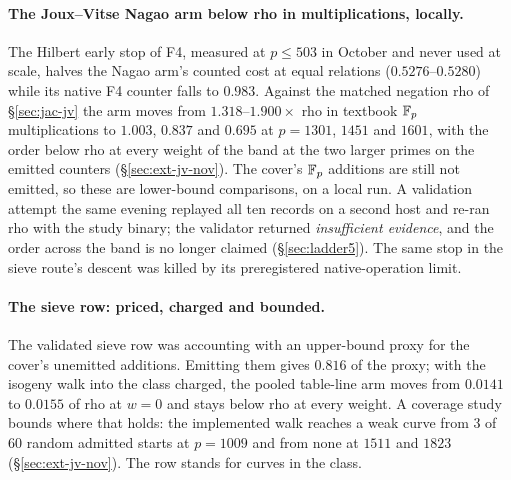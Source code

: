 \paragraph{The Joux--Vitse Nagao arm below rho in multiplications, locally.} The
Hilbert early stop of F4, measured at $p\le503$ in October and never used
at scale, halves the Nagao arm's counted cost at equal relations
($0.5276$--$0.5280$) while its native F4 counter falls to $0.983$. Against
the matched negation rho of \S\ref{sec:jac-jv} the arm moves from
$1.318$--$1.900\times$ rho in textbook $\mathbb{F}_p$ multiplications to $1.003$,
$0.837$ and $0.695$ at $p=1301$, $1451$ and $1601$, with the order below
rho at every weight of the band at the two larger primes on the emitted
counters (\S\ref{sec:ext-jv-nov}). The cover's $\mathbb{F}_p$ additions are still not
emitted, so these are lower-bound comparisons, on a local run. A
validation attempt the same evening replayed all ten records on a second
host and re-ran rho with the study binary; the validator returned
\emph{insufficient evidence}, and the order across the band is no longer
claimed (\S\ref{sec:ladder5}). The same stop in the sieve route's descent
was killed by its preregistered native-operation limit.

\paragraph{The sieve row: priced, charged and bounded.} The validated sieve
row was accounting with an upper-bound proxy for the cover's unemitted
additions. Emitting them gives $0.816$ of the proxy; with the isogeny walk
into the class charged, the pooled table-line arm moves from $0.0141$ to
$0.0155$ of rho at $w=0$ and stays below rho at every weight. A coverage
study bounds where that holds: the implemented walk reaches a weak curve
from 3 of 60 random admitted starts at $p=1009$ and from none at $1511$
and $1823$ (\S\ref{sec:ext-jv-nov}). The row stands for curves in the
class.

